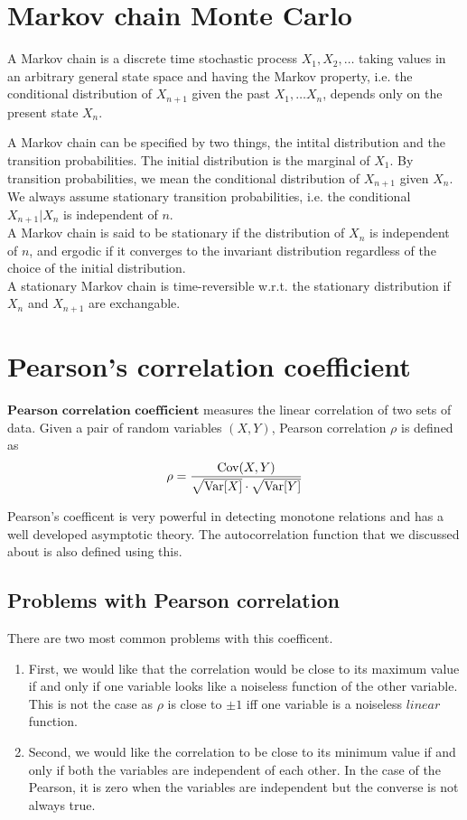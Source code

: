 \documentclass{article}
\begin{document}
\section{Markov chain Monte Carlo}
	A Markov chain is a discrete time stochastic process $X_1, X_2, \dots$ taking values in an arbitrary general state space and having the Markov property,
	i.e. the conditional distribution of $X_{n+1}$ given the past $X_1, \dots X_n$, depends only on the present state $X_n$.

	A Markov chain can be specified by two things, the intital distribution and the transition probabilities.
	The initial distribution is the marginal of $X_1$. By transition probabilities, we mean the conditional distribution of $X_{n+1}$ given $X_n$.
	We always assume stationary transition probabilities, i.e. the conditional $X_{n+1}|X_n$ is independent of $n$.\\
	A Markov chain is said to be stationary if the distribution of $X_n$ is independent of $n$,
	and ergodic if it converges to the invariant distribution regardless of the choice of the initial distribution.\\
	A stationary Markov chain is time-reversible w.r.t. the stationary distribution if $X_n$ and $X_{n+1}$ are exchangable.

\section{Pearson's correlation coefficient}
	$\textbf{Pearson correlation coefficient}$ measures the linear correlation of two sets of data.
	Given a pair of random variables $(X, Y)$, Pearson correlation $\rho$ is defined as
	$$\rho = \frac{\text{Cov}(X, Y)}{\sqrt{\text{Var}[X]} \cdot \sqrt{\text{Var}[Y]}}$$

	Pearson's coefficent is very powerful in detecting monotone relations and
	has a well developed asymptotic theory. The autocorrelation function that we discussed about is also defined using this.

	\subsection{Problems with Pearson correlation}
		There are two most common problems with this coefficent.
		\begin{enumerate}
			\item First, we would like that the correlation would be close to its maximum value
			if and only if one variable looks like a noiseless function of the other variable.
			This is not the case as $\rho$ is close to $\pm 1$ iff one variable is a noiseless $\textit{linear}$ function.
			\item Second, we would like the correlation to be close to its minimum value if and only if both the variables are independent of each other.
			In the case of the Pearson, it is zero when the variables are independent but the converse is not always true.
		\end{enumerate}
\end{document}
